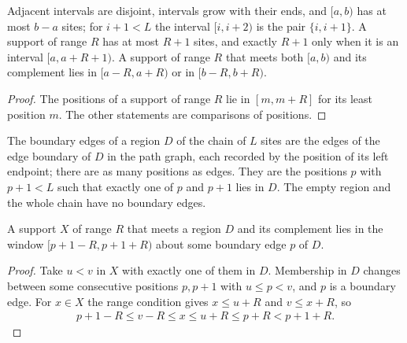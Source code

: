 \begin{lemma}
    \label{lem:sites_chain_support}
    \leanok
    Adjacent intervals are disjoint, intervals grow with their ends, and
    $[a,b)$ has at most $b-a$ sites; for $i+1<L$ the interval
    $[i,i+2)$ is the pair $\{i,i+1\}$. A support of range $R$ has at most $R+1$
    sites, and exactly $R+1$ only when it is an interval $[a,a+R+1)$. A
    support of range $R$ that meets both $[a,b)$ and its complement lies in
    $\lbrack a-R,a+R)$ or in $\lbrack b-R,b+R)$.
\end{lemma}
\begin{proof}\leanok
    The positions of a support of range $R$ lie in $[m,m+R]$ for its least
    position $m$. The other statements are comparisons of positions.
\end{proof}

\begin{definition}
    \label{def:sites_chain_boundary}
    \leanok
    The boundary edges of a region $D$ of the chain of $L$ sites are the edges of the edge
    boundary of $D$ in the path graph, each recorded by the position of its left
    endpoint; there are as many positions as edges. They are the positions $p$ with
    $p+1<L$ such that exactly one of $p$ and $p+1$ lies in $D$. The empty region and the
    whole chain have no boundary edges.
\end{definition}

\begin{lemma}
    \label{lem:sites_chain_boundary_window}
    \leanok
    A support $X$ of range $R$ that meets a region $D$ and its complement lies in
    the window $\lbrack p+1-R,p+1+R)$ about some boundary edge $p$ of $D$.
\end{lemma}
\begin{proof}\leanok
    Take $u<v$ in $X$ with exactly one of them in $D$. Membership in $D$ changes
    between some consecutive positions $p,p+1$ with $u\le p<v$, and $p$ is a
    boundary edge. For $x\in X$ the range condition gives $x\le u+R$ and
    $v\le x+R$, so
    \begin{align*}
        p+1-R\le v-R\le x\le u+R\le p+R<p+1+R.
    \end{align*}
\end{proof}

